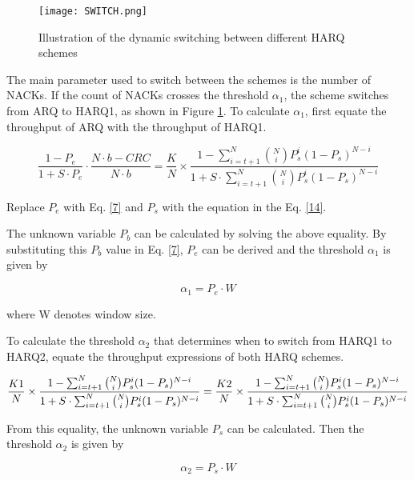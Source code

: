 \documentclass[sn-mathphys-num]{sn-jnl}
\theoremstyle{thmstyleone}
\theoremstyle{thmstyletwo}%
\theoremstyle{thmstylethree}%
\begin{document}
\begin{figure}[H]
    \centering
    \texttt{[image: SWITCH.png]}
    \caption{Illustration of the dynamic switching between different HARQ schemes}
    \label{fig:5}
\end{figure}

The main parameter used to switch between the schemes is the number of NACKs. If the count of NACKs crosses the threshold $\alpha_1$, the scheme switches from ARQ to HARQ1, as shown in Figure \ref{fig:5}. To calculate $\alpha_1$, first equate the throughput of ARQ with the throughput of HARQ1.

\begin{equation}
\frac{1 - P_e}{1 + S \cdot P_e} \cdot \frac{N \cdot b - CRC}{N \cdot b} = \frac{K}{N} \times \frac{1 - \sum_{i=t+1}^{N} \binom{N}{i} P_s^i (1-P_s)^{N-i}}{1 + S \cdot \sum_{i=t+1}^{N} \binom{N}{i} P_s^i (1-P_s)^{N-i}}
\label{14}
\end{equation}

Replace ${P}_e$ with Eq. \ref{7} and ${P}_s$ with the equation in the Eq. \ref{14}.

The unknown variable ${P}_b$ can be calculated by solving the above equality. By substituting this ${P}_b$ value in Eq. \ref{7}, ${P}_e$  can be derived and the threshold $\alpha_1$ is given by

\begin{equation}
    \alpha_1 = P_e \cdot W
\end{equation} 

where W denotes window size.
 
To calculate the threshold $\alpha_2$ that determines when to switch from HARQ1 to HARQ2,  equate the throughput expressions of both HARQ schemes.
 
\begin{equation}
\frac{K1}{N} \times \frac{1 - \sum_{i=t+1}^{N} \binom{N}{i} P_s^i (1-P_s)^{N-i}}{1 + S \cdot \sum_{i=t+1}^{N} \binom{N}{i} P_s^i (1-P_s)^{N-i}} \nonumber \\
= \frac{K2}{N} \times \frac{1 - \sum_{i=t+1}^{N} \binom{N}{i} P_s^i (1-P_s)^{N-i}}{1 + S \cdot \sum_{i=t+1}^{N} \binom{N}{i} P_s^i (1-P_s)^{N-i}} \label{eq:combined2}
\end{equation}

From this equality, the unknown variable $P_s$ can be calculated. Then the threshold $\alpha_2$ is given by

\begin{equation}
    \alpha_2 = P_s \cdot W
\end{equation}
\end{document}
